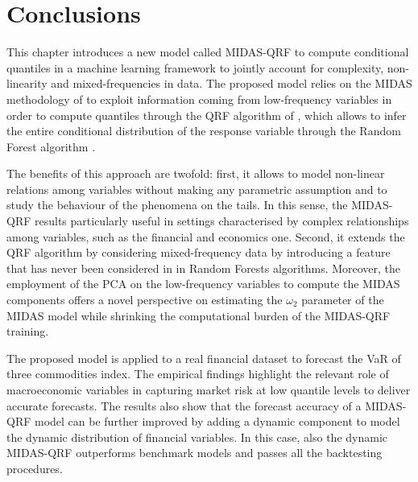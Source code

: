  \section{Conclusions}
 \label{sec:MIDAS-QRF-conclusions}
 
 
This chapter introduces a new model called MIDAS-QRF to compute conditional quantiles in a machine learning framework to jointly account for complexity, non-linearity and mixed-frequencies in data. The proposed model relies on the MIDAS methodology of \cite{ghysels2007midas}  to exploit information coming from low-frequency variables in order to compute quantiles through the QRF algorithm of \cite{meinshausen2006quantile}, which allows to infer the entire conditional distribution of the response variable through the Random Forest algorithm \citep{breiman2001random}. 

\vspace{0.15in}

\noindent The benefits of this approach are twofold: first, it allows to model non-linear relations among variables without making any parametric assumption and to study the behaviour of the phenomena on the tails. In this sense, the MIDAS-QRF results particularly useful in settings characterised by complex relationships among variables, such as the financial and economics one.
Second, it extends the QRF algorithm by considering mixed-frequency data by introducing a feature that has never been considered in in Random Forests algorithms. 
Moreover, the employment of the PCA on the low-frequency variables to compute the MIDAS components offers a novel perspective on estimating the $\omega_2$ parameter of the MIDAS model while shrinking the computational burden of the MIDAS-QRF training.
\vspace{0.15in}

\noindent The proposed model is applied to a real financial dataset to forecast the VaR of three commodities index. The empirical findings highlight the relevant role of macroeconomic variables in capturing market risk at low quantile levels to deliver accurate forecasts. The results also show that the forecast accuracy of a MIDAS-QRF model can be further improved by adding a dynamic component to model the dynamic distribution of financial variables. In this case, also the dynamic MIDAS-QRF outperforms benchmark models and passes all the backtesting procedures.




